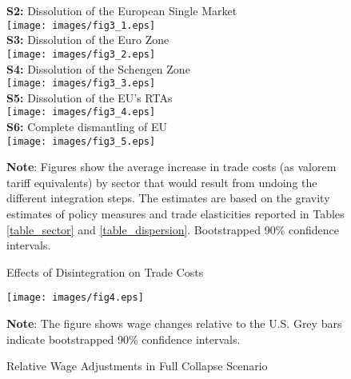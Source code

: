 \documentclass[a4paper,12pt]{article}
\begin{document}
\begin{figure}[!htp]
\centering
\caption{Effects of Disintegration on Trade Costs}
\vspace{0.25cm}
\label{fig:ntb}
\textbf{S2:} Dissolution of the European Single Market\\
\texttt{[image: images/fig3\_1.eps]}\\
\textbf{S3:} Dissolution of the Euro Zone\\
\texttt{[image: images/fig3\_2.eps]}\\
\textbf{S4:} Dissolution of the Schengen Zone\\
\texttt{[image: images/fig3\_3.eps]}\\
\textbf{S5:} Dissolution of the EU's RTAs\\
\texttt{[image: images/fig3\_4.eps]}\\
\textbf{S6:} Complete dismantling of EU\\
\texttt{[image: images/fig3\_5.eps]}
\begin{fignote}{\textwidth}{\scriptsize{\textbf{Note}: Figures show the average increase in trade costs (as valorem tariff equivalents) by sector that would result from undoing the different integration steps. The estimates are based on the gravity estimates of policy measures and trade elasticities reported in Tables \ref{table_sector} and \ref{table_dispersion}. Bootstrapped 90\% confidence intervals.}}
\end{fignote}
\end{figure}%


\begin{figure}[!htp]
\centering
\caption{Relative Wage Adjustments in Full Collapse Scenario}
\label{fig:wage_allEU}
\texttt{[image: images/fig4.eps]}\\
\vspace{-.5cm}\begin{fignote}{\textwidth}{\scriptsize{\textbf{Note}: The figure shows wage changes relative to the U.S. Grey bars indicate bootstrapped 90\% confidence intervals.}}
\end{fignote}
\end{figure}
\end{document}

